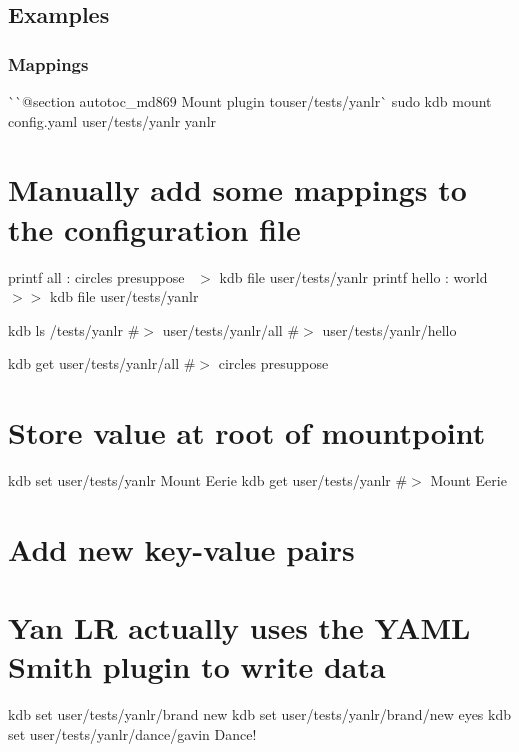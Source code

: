 \begin{DoxyCode}{0}
\end{DoxyCode}
\hypertarget{autotoc_md861_autotoc_md867}{}\subsection{Examples}\label{autotoc_md861_autotoc_md867}
\hypertarget{autotoc_md861_autotoc_md868}{}\subsubsection{Mappings}\label{autotoc_md861_autotoc_md868}
\`{}\`{}{\ttfamily  @section autotoc\+\_\+md869 Mount plugin to}user/tests/yanlr\`{} sudo kdb mount config.\+yaml user/tests/yanlr yanlr\hypertarget{autotoc_md861_autotoc_md870}{}\section{Manually add some mappings to the configuration file}\label{autotoc_md861_autotoc_md870}
printf \textquotesingle{}all \+: circles presuppose~\newline
\textquotesingle{} $>$ {\ttfamily kdb file user/tests/yanlr} printf \textquotesingle{}hello \+: world~\newline
\textquotesingle{} $>$$>$ {\ttfamily kdb file user/tests/yanlr}

kdb ls /tests/yanlr \#$>$ user/tests/yanlr/all \#$>$ user/tests/yanlr/hello

kdb get user/tests/yanlr/all \#$>$ circles presuppose\hypertarget{autotoc_md861_autotoc_md871}{}\section{Store value at root of mountpoint}\label{autotoc_md861_autotoc_md871}
kdb set user/tests/yanlr \textquotesingle{}Mount Eerie\textquotesingle{} kdb get user/tests/yanlr \#$>$ Mount Eerie\hypertarget{autotoc_md861_autotoc_md872}{}\section{Add new key-\/value pairs}\label{autotoc_md861_autotoc_md872}
\hypertarget{autotoc_md861_autotoc_md873}{}\section{Yan L\+R actually uses the Y\+A\+M\+L Smith plugin to write data}\label{autotoc_md861_autotoc_md873}
kdb set user/tests/yanlr/brand new kdb set user/tests/yanlr/brand/new eyes kdb set user/tests/yanlr/dance/gavin \textquotesingle{}Dance!\textquotesingle{}


